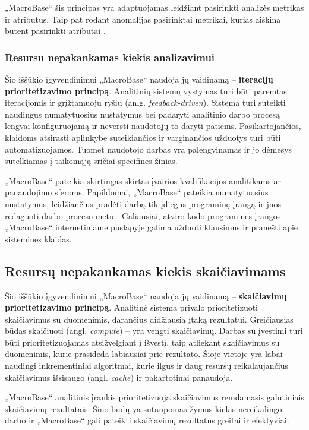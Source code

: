 \documentclass{VUMIFPSbakalaurinis}
\begin{document}
„MacroBase“ šis principas yra adaptuojamas leidžiant pasirinkti analizės metrikas ir atributus. Taip pat rodant anomalijas pasirinktai metrikai, kurias aiškina būtent pasirinkti atributai \cite{prioritizing_attention}.

\subsubsection{Resursu nepakankamas kiekis analizavimui}
Šio iššūkio įgyvendinimui „MacroBase“ naudoja jų vaidinamą – \textbf{iteracijų prioritetizavimo principą}. Analitinių sistemų vystymas turi būti paremtas iteracijomis ir grįžtamuoju ryšiu (anlg. \textit{feedback-driven}). Sistema turi suteikti naudingus numatytuosius nustatymus bei padaryti analitinio darbo procesą lengvai konfigūruojamą ir neversti naudotojų to daryti patiems. Pasikartojančios, klaidoms atsirasti aplinkybe suteikiančios ir varginančios užduotys turi būti automatizuojamos. Tuomet naudotojo darbas yra palengvinamas ir jo dėmesys sutelkiamas į taikomąją sričiai specifines žinias. \par

„MacroBase“ pateikia skirtingas skirtas įvairios kvalifikacijos analitikams ar panaudojimo sferoms. Papildomai, „MacroBase“ pateikia numatytuosius nustatymus, leidžiančius pradėti darbą tik įdiegus programinę įrangą ir juos redaguoti darbo proceso metu \cite{demonstration, prioritizing_attention}. Galiausiai, atviro kodo programinės įrangos „MacroBase“ internetiniame puslapyje galima užduoti klausimus ir pranešti apie sistemines klaidas.

\subsection{Resursų nepakankamas kiekis skaičiavimams}
Šio iššūkio įgyvendinimui „MacroBase“ naudoja jų vaidinamą – \textbf{skaičiavimų prioritetizavimo principą}. Analitinė sistema privalo prioritetizuoti skaičiavimus su duomenimis, darančius didžiausią įtaką rezultatui. Greičiausias būdas skaičiuoti (angl. \textit{compute}) – yra vengti skaičiavimų. Darbas su įvestimi turi būti prioritetizuojamas atsižvelgiant į išvestį, taip atliekant skaičiavimus su duomenimis, kurie prasideda labiausiai prie rezultato. Šioje vietoje yra labai naudingi inkrementiniai algoritmai, kurie ilgus ir daug resursų reikalaujančius skaičiavimus išsisaugo (angl. \textit{cache}) ir pakartotinai panaudoja. \par

„MacroBase“ analitinis įrankis prioritetizuoja skaičiavimus remdamasis galutiniais skaičiavimų rezultatais. Šiuo būdų ya  sutaupomas žymus kiekis nereikalingo darbo \cite{prioritizing_attention} ir „MacroBase“ gali pateikti skaičiavimų rezultatus greitai ir efektyviai.
\end{document}
